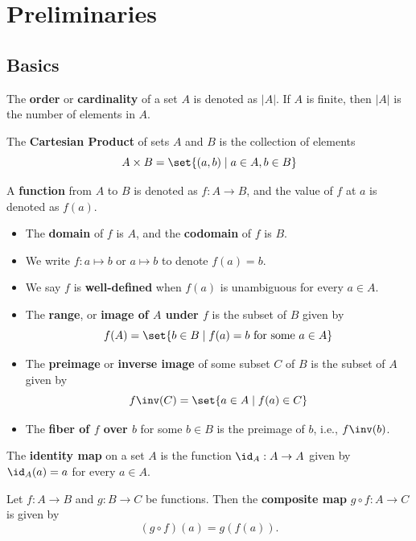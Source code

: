 \setcounter{section}{-1}

\section{Preliminaries}

\subsection{Basics} \label{sec0.1}

 The \textbf{order} or \textbf{cardinality} of a set $A$ is denoted as $|A|$. If $A$ is finite, then $|A|$ is the number of elements in $A$.

 The \textbf{Cartesian Product} of sets $A$ and $B$ is the collection of elements
\[A \times B = \set{(a, b) \mid a \in A, b \in B}\]

 A \textbf{function} from $A$ to $B$ is denoted as $f : A \to B$, and the value of $f$ at $a$ is denoted as $f(a)$.
\begin{itemize}
    \item The \textbf{domain} of $f$ is $A$, and the \textbf{codomain} of $f$ is $B$.
    \item We write $f : a \mapsto b$ or $a \mapsto b$ to denote $f(a) = b$.
    \item We say $f$ is \textbf{well-defined} when $f(a)$ is unambiguous for every $a \in A$.
    \item The \textbf{range}, or \textbf{image of $A$ under $f$} is the subset of $B$ given by
    \[f(A) = \set{b \in B \mid f(a) = b \text{ for some } a \in A}\]
    \item The \textbf{preimage} or \textbf{inverse image} of some subset $C$ of $B$ is the subset of $A$ given by
    \[f\inv(C) = \set{a \in A \mid f(a) \in C}\]
    \item The \textbf{fiber of $f$ over $b$} for some $b \in B$ is the preimage of $b$, i.e., $f\inv(b)$.
\end{itemize}

 The \textbf{identity map} on a set $A$ is the function $\id_A : A \to A$ given by $\id_A(a) = a$ for every $a \in A$.

 Let $f : A \to B$ and $g : B \to C$ be functions. Then the \textbf{composite map} $g \circ f : A \to C$ is given by
\[(g \circ f)(a) = g(f(a)).\]

